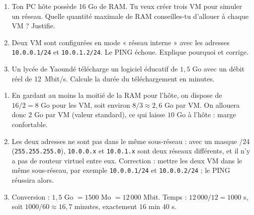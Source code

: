 \documentclass[11pt]{article}
\begin{document}
\begin{exercice}
\begin{enumerate}
\item Ton PC hôte possède 16 Go de RAM. Tu veux créer trois VM pour simuler un réseau. Quelle quantité maximale de RAM conseilles-tu d'allouer à chaque VM ? Justifie.
\item Deux VM sont configurées en mode « réseau interne » avec les adresses \texttt{10.0.0.1/24} et \texttt{10.0.1.2/24}. Le PING échoue. Explique pourquoi et corrige.
\item Un lycée de Yaoundé télécharge un logiciel éducatif de $1{,}5$ Go avec un débit réel de \SI{12}{Mbit/s}. Calcule la durée du téléchargement en minutes.
\end{enumerate}
\end{exercice}

\begin{corrige}
\begin{enumerate}
\item En gardant au moins la moitié de la RAM pour l'hôte, on dispose de $16 / 2 = 8$ Go pour les VM, soit environ $8 / 3 \approx 2{,}6$ Go par VM. On allouera donc $2$ Go par VM (valeur standard), ce qui laisse $10$ Go à l'hôte : marge confortable.
\item Les deux adresses ne sont pas dans le même sous-réseau : avec un masque /24 (\texttt{255.255.255.0}), \texttt{10.0.0.x} et \texttt{10.0.1.x} sont deux réseaux différents, et il n'y a pas de routeur virtuel entre eux. Correction : mettre les deux VM dans le même sous-réseau, par exemple \texttt{10.0.0.1/24} et \texttt{10.0.0.2/24} ; le PING réussira alors.
\item Conversion : $1{,}5$ Go $= 1500$ Mo $= 12\,000$ Mbit. Temps : $12\,000 / 12 = 1000$ s, soit $1000 / 60 \approx 16{,}7$ minutes, exactement $16$ min $40$ s.
\end{enumerate}
\end{corrige}
\end{document}
